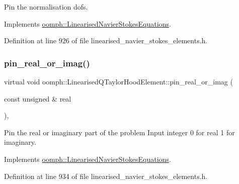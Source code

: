 Pin the normalisation dofs. 



Implements \hyperlink{classoomph_1_1LinearisedNavierStokesEquations_a811cc53be5ee3239d31185b6264584f6}{oomph\+::\+Linearised\+Navier\+Stokes\+Equations}.



Definition at line 926 of file linearised\+\_\+navier\+\_\+stokes\+\_\+elements.\+h.

\mbox{\label{classoomph_1_1LinearisedQTaylorHoodElement_a84bb4ee14849c6ed91b0005b1c9b06dc}} 
\subsubsection{\texorpdfstring{pin\+\_\+real\+\_\+or\+\_\+imag()}{pin\_real\_or\_imag()}}
{\footnotesize\ttfamily virtual void oomph\+::\+Linearised\+Q\+Taylor\+Hood\+Element\+::pin\+\_\+real\+\_\+or\+\_\+imag (\begin{DoxyParamCaption}\item[{const unsigned \&}]{real }\end{DoxyParamCaption})\hspace{0.3cm}{\ttfamily [inline]}, {\ttfamily [virtual]}}



Pin the real or imaginary part of the problem Input integer 0 for real 1 for imaginary. 



Implements \hyperlink{classoomph_1_1LinearisedNavierStokesEquations_a202921e1739b6aa174e1b64ebb1b14cd}{oomph\+::\+Linearised\+Navier\+Stokes\+Equations}.



Definition at line 934 of file linearised\+\_\+navier\+\_\+stokes\+\_\+elements.\+h.

\mbox{\label{classoomph_1_1LinearisedQTaylorHoodElement_a948a02f3480faa9439fb72932e344dcf}} 
